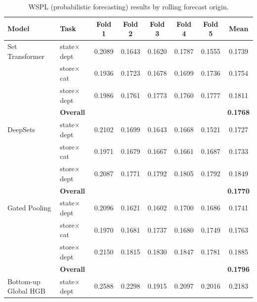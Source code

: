 \begin{table}[H]
  \centering
  \caption{WSPL (probabilistic forecasting) results by rolling forecast origin.}
  \label{tab:appendix_rolling_folds_quantile}
  \begin{threeparttable}
    \footnotesize
    \begin{tabular}{llccccc|c}
      \toprule
      \textbf{Model} & \textbf{Task} & \textbf{Fold 1} & \textbf{Fold 2} & \textbf{Fold 3} & \textbf{Fold 4} & \textbf{Fold 5} & \textbf{Mean} \\
      \midrule
      Set Transformer              & state$\times$dept      &   0.2089 &   0.1643 &   0.1620 &   0.1787 &   0.1555 &   0.1739 \\
                                   & store$\times$cat       &   0.1936 &   0.1723 &   0.1678 &   0.1699 &   0.1736 &   0.1754 \\
                                   & store$\times$dept      &   0.1986 &   0.1761 &   0.1773 &   0.1760 &   0.1777 &   0.1811 \\
                                   & {\bf Overall} & & & & & & {\bf 0.1768} \\
      \addlinespace
      DeepSets                     & state$\times$dept      &   0.2102 &   0.1699 &   0.1643 &   0.1668 &   0.1521 &   0.1727 \\
                                   & store$\times$cat       &   0.1971 &   0.1679 &   0.1667 &   0.1661 &   0.1687 &   0.1733 \\
                                   & store$\times$dept      &   0.2087 &   0.1771 &   0.1792 &   0.1805 &   0.1792 &   0.1849 \\
                                   & {\bf Overall} & & & & & & {\bf 0.1770} \\
      \addlinespace
      Gated Pooling                & state$\times$dept      &   0.2096 &   0.1621 &   0.1602 &   0.1700 &   0.1686 &   0.1741 \\
                                   & store$\times$cat       &   0.1970 &   0.1681 &   0.1737 &   0.1680 &   0.1749 &   0.1763 \\
                                   & store$\times$dept      &   0.2150 &   0.1815 &   0.1830 &   0.1847 &   0.1781 &   0.1885 \\
                                   & {\bf Overall} & & & & & & {\bf 0.1796} \\
      \addlinespace
      Bottom-up Global HGB         & state$\times$dept      &   0.2588 &   0.2298 &   0.1915 &   0.2097 &   0.2016 &   0.2183 \\

\end{tabular}
\end{threeparttable}
\end{table}
